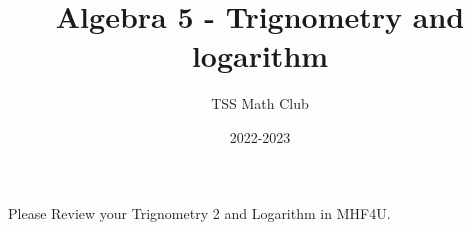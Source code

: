 \documentclass{article}
\title{Algebra 5 - Trignometry and logarithm }
\author{TSS Math Club}
\date{2022-2023}
\begin{document}
\large

\maketitle

\center

Please Review your Trignometry 2 and Logarithm in MHF4U.
\end{document}
